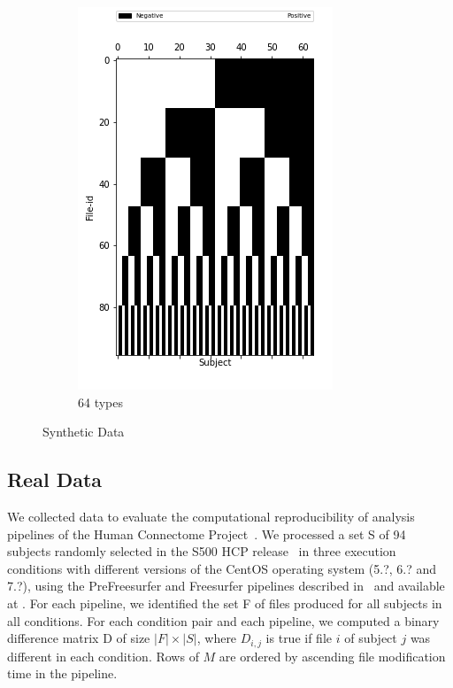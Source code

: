 \documentclass[10pt, conference, compsocconf]{IEEEtran}
\newcommand{\todo}[1]{\marginpar{\parbox{18mm}{\flushleft\tiny\color{red}\textbf{TODO}:
      #1}}}
\begin{document}
\begin{figure}
\begin{subfigure}[b]{0.4\linewidth}
                  \includegraphics[width=\columnwidth]{data/Utility_Matrix/Synthetic/synthetic_subject_types/64_SubjectType_utility_matrix.png}
                  \caption{64 types}
        \end{subfigure}
\caption{Synthetic Data}
\label{fig:synthetic-data}
\end{figure}

\subsection{Real Data}

We collected data to evaluate the computational reproducibility of analysis
pipelines of the Human Connectome Project~\cite{glasser2013minimal}. We
processed a set S of 94 subjects randomly selected in the S500 HCP
release~\todo{URL} in three execution conditions with different
versions of the CentOS operating system (5.?, 6.? and 7.?), using the
PreFreesurfer and Freesurfer pipelines
described in~\cite{glasser2013minimal} and available at \todo{URL}. For
each pipeline, we identified the set F of files produced for all
subjects in all conditions. For each condition pair and each pipeline,
we computed a binary difference matrix D of size $|F|\times|S|$, where $D_{i,j}$ is true
if file $i$ of subject $j$ was different in each condition. Rows of
$M$ are ordered by ascending file modification time in the pipeline.
\end{document}
